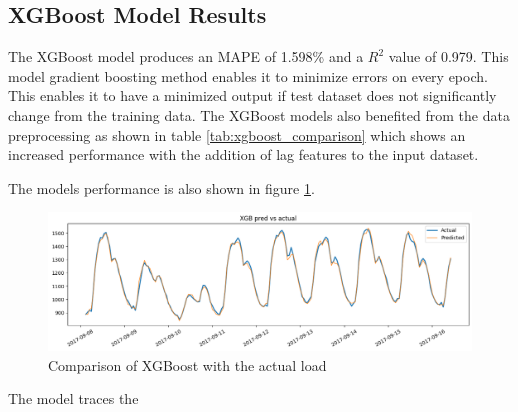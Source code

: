  \subsection{XGBoost Model Results}
 
 The XGBoost model produces an MAPE of 1.598\% and a $R^2$ value of 0.979. This model gradient boosting method enables it to minimize errors on every epoch. This enables it to have a minimized output if test dataset does not significantly change from the training data. The XGBoost models also benefited from the data preprocessing as shown in table \ref{tab:xgboost_comparison} which shows an increased performance with the addition of lag features to the input dataset.
 \begin{table}[h!]
 	\centering
 	\small
 	\caption{Comparison of XGBoost Results with Different Data Processing Techniques}
 		
 	\label{tab:xgboost_comparison}
 \end{table}
 The models performance is also shown in figure \ref{fig:xgboostoutput}.
 \begin{figure}[h!]
 	\centering
 	\includegraphics[width=0.75\linewidth]{Chapters/images/results/xgboost_output}
 	\caption{Comparison of XGBoost with the actual load}
 	\label{fig:xgboostoutput}
 \end{figure}
 The model traces the 

